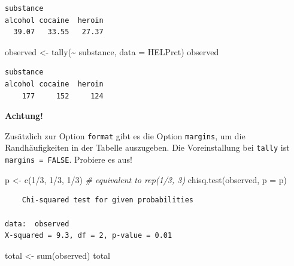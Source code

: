 \documentclass[
  ngerman,
]{scrbook}
\newenvironment{Shaded}{\begin{snugshade}}{\end{snugshade}}
\newcommand{\AttributeTok}[1]{\textcolor[rgb]{0.77,0.63,0.00}{#1}}
\newcommand{\CommentTok}[1]{\textcolor[rgb]{0.56,0.35,0.01}{\textit{#1}}}
\newcommand{\DecValTok}[1]{\textcolor[rgb]{0.00,0.00,0.81}{#1}}
\newcommand{\FunctionTok}[1]{\textcolor[rgb]{0.00,0.00,0.00}{#1}}
\newcommand{\NormalTok}[1]{#1}
\newcommand{\OtherTok}[1]{\textcolor[rgb]{0.56,0.35,0.01}{#1}}
\newcommand{\SpecialCharTok}[1]{\textcolor[rgb]{0.00,0.00,0.00}{#1}}
\newenvironment{achtung}[1]
  {
  \begin{itemize}
  \renewcommand{\labelitemi}{
    \raisebox{1.8\height}[0pt][0pt]{
      {\setkeys{Gin}{width=7em,keepaspectratio}
        {\Large \textcolor{dark-fom-green}\faExclamationCircle}}
        }
  }
  \begin{blackbox}
        \bgroup\color{dark-fom-green}
          {\textbf{Achtung!}}
        \egroup
  \item
  }
  {
  \end{blackbox}
  \end{itemize}
  }
\begin{document}
\begin{verbatim}
substance
alcohol cocaine  heroin 
  39.07   33.55   27.37 
\end{verbatim}

\begin{Shaded}
\begin{Highlighting}[]
\NormalTok{observed }\OtherTok{\textless{}{-}} \FunctionTok{tally}\NormalTok{(}\SpecialCharTok{\textasciitilde{}}\NormalTok{ substance, }
                  \AttributeTok{data =}\NormalTok{ HELPrct)}
\NormalTok{observed}
\end{Highlighting}
\end{Shaded}

\begin{verbatim}
substance
alcohol cocaine  heroin 
    177     152     124 
\end{verbatim}

\begin{achtung}{achtung}
Zusätzlich zur Option \texttt{format} gibt es die Option \texttt{margins}, um die Randhäufigkeiten in der Tabelle auszugeben. Die Voreinstallung bei \texttt{tally} ist \texttt{margins\ =\ FALSE}. Probiere es aus!

\end{achtung}

\begin{Shaded}
\begin{Highlighting}[]
\NormalTok{p }\OtherTok{\textless{}{-}} \FunctionTok{c}\NormalTok{(}\DecValTok{1}\SpecialCharTok{/}\DecValTok{3}\NormalTok{, }\DecValTok{1}\SpecialCharTok{/}\DecValTok{3}\NormalTok{, }\DecValTok{1}\SpecialCharTok{/}\DecValTok{3}\NormalTok{) }\CommentTok{\# equivalent to rep(1/3, 3) }
\FunctionTok{chisq.test}\NormalTok{(observed, }\AttributeTok{p =}\NormalTok{ p)}
\end{Highlighting}
\end{Shaded}

\begin{verbatim}
    Chi-squared test for given probabilities

data:  observed
X-squared = 9.3, df = 2, p-value = 0.01
\end{verbatim}

\begin{Shaded}
\begin{Highlighting}[]
\NormalTok{total }\OtherTok{\textless{}{-}} \FunctionTok{sum}\NormalTok{(observed)}
\NormalTok{total}
\end{Highlighting}
\end{Shaded}
\end{document}
